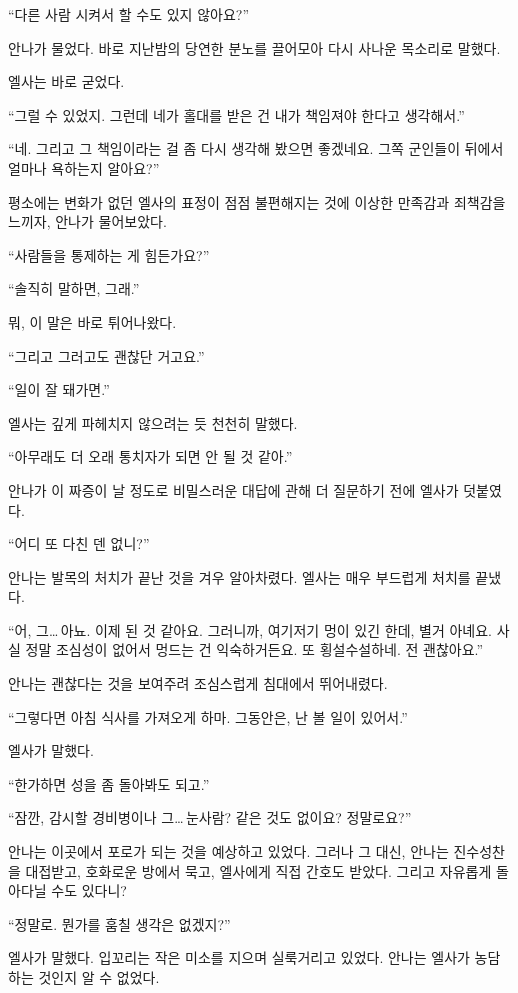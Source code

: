 ``다른 사람 시켜서 할 수도 있지 않아요?''

안나가 물었다. 바로 지난밤의 당연한 분노를 끌어모아 다시 사나운 목소리로 말했다.

엘사는 바로 굳었다.

``그럴 수 있었지. 그런데 네가 홀대를 받은 건 내가 책임져야 한다고 생각해서.''

``네. 그리고 그 책임이라는 걸 좀 다시 생각해 봤으면 좋겠네요. 그쪽 군인들이 뒤에서 얼마나 욕하는지 알아요?''

평소에는 변화가 없던 엘사의 표정이 점점 불편해지는 것에 이상한 만족감과 죄책감을 느끼자, 안나가 물어보았다.

``사람들을 통제하는 게 힘든가요?''

``솔직히 말하면, 그래.''

뭐, 이 말은 바로 튀어나왔다.

``그리고 그러고도 괜찮단 거고요.''

``일이 잘 돼가면.''

엘사는 깊게 파헤치지 않으려는 듯 천천히 말했다.

``아무래도 더 오래 통치자가 되면 안 될 것 같아.''

안나가 이 짜증이 날 정도로 비밀스러운 대답에 관해 더 질문하기 전에 엘사가 덧붙였다.

``어디 또 다친 덴 없니?''

안나는 발목의 처치가 끝난 것을 겨우 알아차렸다. 엘사는 매우 부드럽게 처치를 끝냈다.

``어, 그\ldots\,아뇨. 이제 된 것 같아요. 그러니까, 여기저기 멍이 있긴 한데, 별거 아녜요. 사실 정말 조심성이 없어서 멍드는 건 익숙하거든요. 또 횡설수설하네. 전 괜찮아요.''

안나는 괜찮다는 것을 보여주려 조심스럽게 침대에서 뛰어내렸다.

``그렇다면 아침 식사를 가져오게 하마. 그동안은, 난 볼 일이 있어서.''

엘사가 말했다.

``한가하면 성을 좀 돌아봐도 되고.''

``잠깐, 감시할 경비병이나 그\ldots\,눈사람? 같은 것도 없이요? 정말로요?''

안나는 이곳에서 포로가 되는 것을 예상하고 있었다. 그러나 그 대신, 안나는 진수성찬을 대접받고, 호화로운 방에서 묵고, 엘사에게 직접 간호도 받았다. 그리고 자유롭게 돌아다닐 수도 있다니?

``정말로. 뭔가를 훔칠 생각은 없겠지?''

엘사가 말했다. 입꼬리는 작은 미소를 지으며 실룩거리고 있었다. 안나는 엘사가 농담하는 것인지 알 수 없었다.

